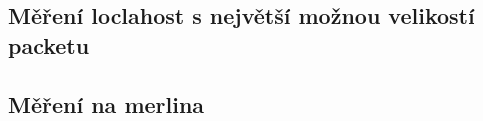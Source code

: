 \documentclass[11pt] {article}
\begin{document}
\subsection{Měření loclahost s největší možnou velikostí packetu}
\newline
\subsection{Měření na merlina}
\newline
\end{document}
